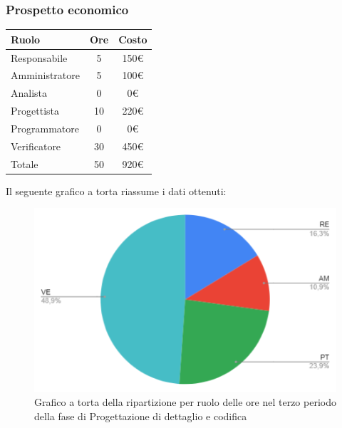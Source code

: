 {{{{{{{{{{{{{{		\subsubsection{Prospetto economico}\label{PreventivoFaseDiProgettazioneDiDettaglioECodificaProspettoEconomicoPeriodo3}
		\quad
		\def\tabularxcolumn#1{m{#1}}
		{
			\begin{center}
				\renewcommand{\arraystretch}{1.4}
				\begin{tabularx}{7cm}{|X|c|c|}
					\hline
					\rowcolor{airforceblue}
					\textbf{Ruolo} & \textbf{Ore} & \textbf{Costo}\\
					\hline
					Responsabile & 5 & 150\euro\\
					\hline
					Amministratore & 5 & 100\euro\\
					\hline
					Analista & 0 & 0\euro\\
					\hline
					Progettista & 10 & 220\euro\\
					\hline
					Programmatore & 0 & 0\euro\\
					\hline
					Verificatore & 30 & 450\euro\\
					\hline
					Totale & 50 & 920\euro\\
					\hline
				\end{tabularx}
			\end{center}
			
			Il seguente grafico a torta riassume i dati ottenuti:
			\begin{figure}[!ht]
				\begin{center}
					\includegraphics[width=0.8\linewidth]{../immagini/pdp/torta_progettazione_dettaglio_periodo3.png}
					\caption{Grafico a torta della ripartizione per ruolo delle ore nel terzo periodo della fase di Progettazione
						di dettaglio e codifica}
				\end{center}
			\end{figure}
		
}}}}}}}}}}}}}}}
